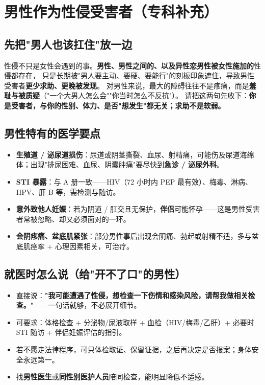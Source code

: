 
\chapter{男性作为性侵受害者（专科补充）}

\section{先把"男人也该扛住"放一边}
性侵不只是女性会遇到的事。\textbf{男性、男性之间的、以及异性恋男性被女性施加的}性侵都存在，
只是长期被"男人要主动、要硬、要能行"的刻板印象遮住，导致男性受害者\textbf{更少求助、更晚被发现}。
对男性来说，最大的障碍往往不是疼痛，而是\textbf{羞耻与被质疑}（"一个大男人怎么会""你当时怎么不反抗"）。
请把这两句先收下：\textbf{你是受害者，与你的性别、体力、是否"想发生"都无关；求助不是软弱。}

\section{男性特有的医学要点}
\begin{itemize}
  \item \textbf{生殖道 / 泌尿道损伤}：尿道或阴茎撕裂、血尿、射精痛，可能伤及尿道海绵体；出现"排尿困难、血尿、阴囊肿痛"要尽快到\textbf{急诊 / 泌尿外科}。
  \item \textbf{STI 暴露}：与 A 册一致——HIV（72 小时内 PEP 最有效）、梅毒、淋病、HPV、肝 B 等，需检测与随访。
  \item \textbf{意外致他人妊娠}：若为阴道 / 肛交且无保护，\textbf{伴侣}可能怀孕——这是男性受害者常被忽略、却又必须面对的一环。
  \item \textbf{会阴疼痛、盆底肌紧张}：部分男性事后出现会阴痛、勃起或射精不适，多与盆底肌痉挛 + 心理因素相关，可治疗。
\end{itemize}

\section{就医时怎么说（给"开不了口"的男性）}
\begin{itemize}
  \item 直接说：\textbf{"我可能遭遇了性侵，想检查一下伤情和感染风险，请帮我做相关检查。"}——一句话就够，不必展开细节。
  \item 可要求：体格检查 + 分泌物/尿液取样 + 血检（HIV/梅毒/乙肝）+ 必要时 STI 随访 + 伴侣妊娠评估的指引。
  \item 若不愿走法律程序，可只体检取证、保留证据，之后再决定是否报案；身体安全永远第一。
  \item 找\textbf{男性医生}或\textbf{同性别医护人员}陪同检查，能明显降低不适感。
\end{itemize}

